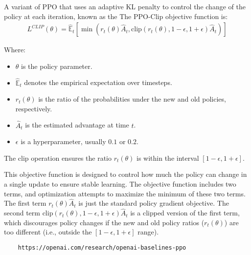 A variant of PPO that uses an adaptive KL penalty to control the change of the policy at each iteration, known as the The PPO-Clip objective function is:
\begin{align*}
L^{CLIP}(\theta) = \hat{\mathbb{E}}_t \left[ \min \left( r_t(\theta) \hat{A}_t, \text{clip}(r_t(\theta), 1-\epsilon, 1+\epsilon) \hat{A}_t \right) \right]
\end{align*}

Where:
\begin{itemize}
    \item $\theta$ is the policy parameter.
    \item $\hat{\mathbb{E}}_t$ denotes the empirical expectation over timesteps.
    \item $r_t(\theta)$ is the ratio of the probabilities under the new and old policies, respectively.
    \item $\hat{A}_t$ is the estimated advantage at time $t$.
    \item $\epsilon$ is a hyperparameter, usually $0.1$ or $0.2$.
\end{itemize}
The clip operation ensures the ratio $r_t(\theta)$ is within the interval $[1-\epsilon, 1+\epsilon]$.

This objective function is designed to control how much the policy can change in a single update to ensure stable learning. The objective function includes two terms, and optimization attempts to maximize the minimum of these two terms. The first term $r_t(\theta) \hat{A}_t$ is just the standard policy gradient objective. The second term $\text{clip}(r_t(\theta), 1-\epsilon, 1+\epsilon) \hat{A}_t$ is a clipped version of the first term, which discourages policy changes if the new and old policy ratios ($r_t(\theta)$) are too different (i.e., outside the $[1-\epsilon, 1+\epsilon]$ range).
\begin{verbatim}
    https://openai.com/research/openai-baselines-ppo
\end{verbatim}
